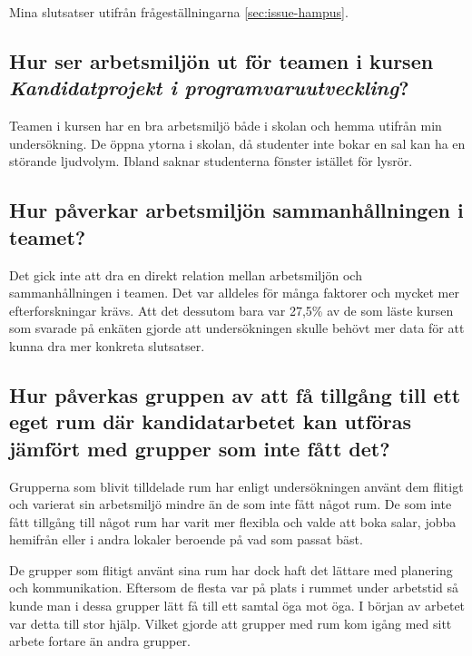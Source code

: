 Mina slutsatser utifrån frågeställningarna \ref{sec:issue-hampus}.

\subsection{Hur ser arbetsmiljön ut för teamen i kursen \textit{Kandidatprojekt i programvaruutveckling}?}
Teamen i kursen har en bra arbetsmiljö både i skolan och hemma utifrån min undersökning. De öppna ytorna i skolan, då studenter inte bokar en sal kan ha en störande ljudvolym. Ibland saknar studenterna fönster istället för lysrör. 

\subsection{Hur påverkar arbetsmiljön sammanhållningen i teamet?}
Det gick inte att dra en direkt relation mellan arbetsmiljön och sammanhållningen i teamen. Det var alldeles för många faktorer och mycket mer efterforskningar krävs. Att det dessutom bara var 27,5\% av de som läste kursen som svarade på enkäten gjorde att undersökningen skulle behövt mer data för att kunna dra mer konkreta slutsatser.

\subsection{Hur påverkas gruppen av att få tillgång till ett eget rum där kandidatarbetet kan utföras jämfört med grupper som inte fått det?}
Grupperna som blivit tilldelade rum har enligt undersökningen använt dem flitigt och varierat sin arbetsmiljö mindre än de som inte fått något rum. De som inte fått tillgång till något rum har varit mer flexibla och valde att boka salar, jobba hemifrån eller i andra lokaler beroende på vad som passat bäst. 

De grupper som flitigt använt sina rum har dock haft det lättare med planering och kommunikation. Eftersom de flesta var på plats i rummet under arbetstid så kunde man i dessa grupper lätt få till ett samtal öga mot öga. I början av arbetet var detta till stor hjälp. Vilket gjorde att grupper med rum kom igång med sitt arbete fortare än andra grupper.


